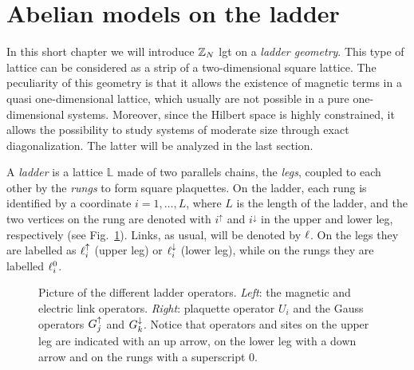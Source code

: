 \section{Abelian models on the ladder}
\label{sec:abelian_models_on_the_ladder}

In this short chapter we will introduce $\Z_N$ \ac{lgt} on a \emph{ladder geometry}.
This type of lattice can be considered as a strip of a two-dimensional square lattice.
The peculiarity of this geometry is that it allows the existence of magnetic terms in a quasi one-dimensional lattice, which usually are not possible in a pure one-dimensional systems.
Moreover, since the Hilbert space is highly constrained, it allows the possibility to study systems of moderate size through exact diagonalization.
The latter will be analyzed in the last section.

A \emph{ladder} is a lattice $\mathbb{L}$ made of two parallels chains, the \emph{legs}, coupled to each other by the \emph{rungs} to form square plaquettes.
On the ladder, each rung is identified by a coordinate $i=1,\dots,L$, where $L$ is the length of the ladder, and the two vertices on the rung are denoted with $i^{\uparrow}$ and $i^{\downarrow}$ in the upper and lower leg, respectively (see Fig.~\ref{fig:ladder_operators}).
Links, as usual, will be denoted by $\ell$.
On the legs they are labelled as $\ell^\uparrow_i$ (upper leg) or $\ell^\downarrow_i$ (lower leg), while on the rungs they are labelled $\ell^0_i$.

\begin{figure}[t]
    \centering
    
    \caption[Operators of a $\Z_N$ ladder \ac{lgt}]{%
        Picture of the different ladder operators.
        \emph{Left}: the magnetic and electric link operators.
        \emph{Right}: plaquette operator $U_i$ and the Gauss operators $G^{\uparrow}_j$ and $G^{\downarrow}_k$.
        Notice that operators and sites on the upper leg are indicated with an up arrow, on the lower leg with a down arrow and on the rungs with a superscript $0$.
    }
    \label{fig:ladder_operators}
\end{figure}


